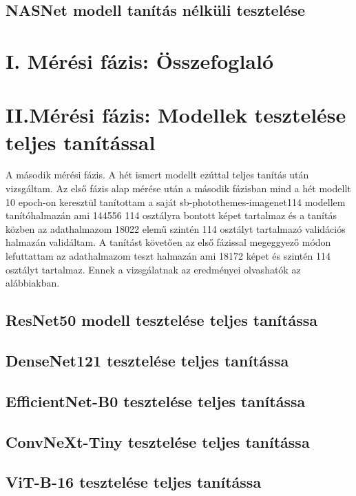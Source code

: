 \documentclass[	
  noindent
]{elteikthesis}[2024/04/26]
\begin{document}
    \subsection{NASNet modell tanítás nélküli tesztelése}
      

    \section{I. Mérési fázis: Összefoglaló}
      

  \section{II.Mérési fázis: Modellek tesztelése teljes tanítással}
    A második mérési fázis. A hét ismert modellt ezúttal teljes tanítás után vizsgáltam. Az első fázis alap mérése után a második fázisban mind a hét modellt 10 epoch-on keresztül tanítottam a saját sb-photothemes-imagenet114 modellem tanítóhalmazán ami 144556 114 osztályra bontott képet tartalmaz és a tanítás közben az adathalmazom 18022 elemű szintén 114 osztályt tartalmazó validációs halmazán validáltam.
    A tanítást követően az első fázissal megeggyező módon lefuttattam az adathalmazom teszt halmazán ami 18172 képet és szintén 114 osztályt tartalmaz. Ennek a vizsgálatnak az eredményei olvashatók az alábbiakban.

    \subsection{ResNet50 modell tesztelése teljes tanítássa}
      
    \subsection{DenseNet121 tesztelése teljes tanítássa}
      
    \subsection{EfficientNet-B0 tesztelése teljes tanítássa}
      
    \subsection{ConvNeXt-Tiny tesztelése teljes tanítássa}
      
    \subsection{ViT-B-16 tesztelése teljes tanítássa}
      
\end{document}
